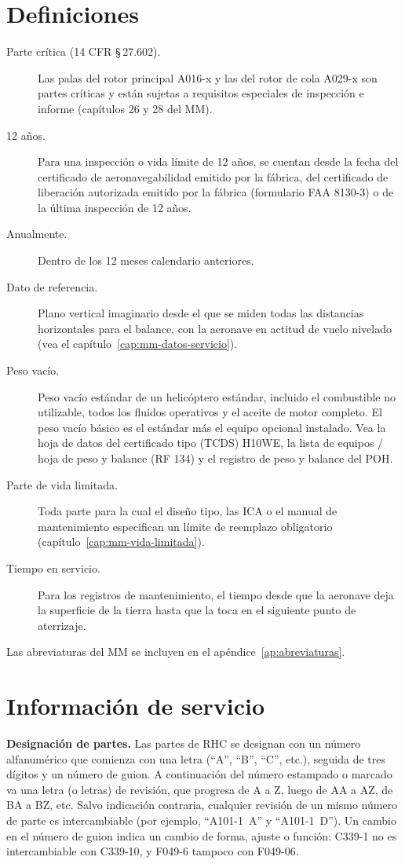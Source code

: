 \section{Definiciones}

\begin{description}
\item[Parte crítica (14 CFR \S\,27.602).] Las palas del rotor principal A016-x y las del rotor de cola A029-x son partes críticas y están sujetas a requisitos especiales de inspección e informe (capítulos 26 y 28 del MM).
\item[12 años.] Para una inspección o vida límite de 12 años, se cuentan desde la fecha del certificado de aeronavegabilidad emitido por la fábrica, del certificado de liberación autorizada emitido por la fábrica (formulario FAA 8130-3) o de la última inspección de 12 años.
\item[Anualmente.] Dentro de los 12 meses calendario anteriores.
\item[Dato de referencia.] Plano vertical imaginario desde el que se miden todas las distancias horizontales para el balance, con la aeronave en actitud de vuelo nivelado (vea el capítulo~\ref{cap:mm-datos-servicio}).
\item[Peso vacío.] Peso vacío estándar de un helicóptero estándar, incluido el combustible no utilizable, todos los fluidos operativos y el aceite de motor completo. El peso vacío básico es el estándar más el equipo opcional instalado. Vea la hoja de datos del certificado tipo (TCDS) H10WE, la lista de equipos / hoja de peso y balance (RF 134) y el registro de peso y balance del POH.
\item[Parte de vida limitada.] Toda parte para la cual el diseño tipo, las ICA o el manual de mantenimiento especifican un límite de reemplazo obligatorio (capítulo~\ref{cap:mm-vida-limitada}).
\item[Tiempo en servicio.] Para los registros de mantenimiento, el tiempo desde que la aeronave deja la superficie de la tierra hasta que la toca en el siguiente punto de aterrizaje.
\end{description}

Las abreviaturas del MM se incluyen en el apéndice~\ref{ap:abreviaturas}.

\section{Información de servicio}

\textbf{Designación de partes.} Las partes de RHC se designan con un número alfanumérico que comienza con una letra (``A'', ``B'', ``C'', etc.), seguida de tres dígitos y un número de guion. A continuación del número estampado o marcado va una letra (o letras) de revisión, que progresa de A a Z, luego de AA a AZ, de BA a BZ, etc. Salvo indicación contraria, cualquier revisión de un mismo número de parte es intercambiable (por ejemplo, ``A101-1~A'' y ``A101-1~D''). Un cambio en el número de guion indica un cambio de forma, ajuste o función: C339-1 no es intercambiable con C339-10, y F049-6 tampoco con F049-06.

